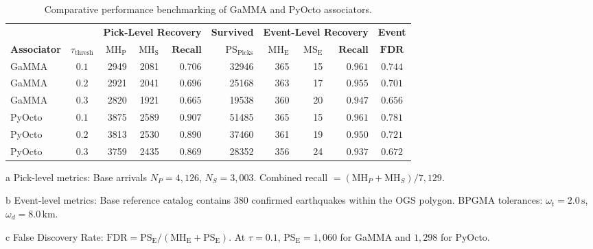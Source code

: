 \begin{table}[htbp]
  \centering
  \small
  \caption{Comparative performance benchmarking of GaMMA and PyOcto associators.}
  \label{tab:associator_benchmark}
  \begin{threeparttable}
    \begin{tabularx}{\linewidth}{l c r r r r r r r c}
      \toprule
      & & \multicolumn{3}{c}{\textbf{Pick-Level Recovery}\tnote{a}} & \textbf{Survived} & \multicolumn{3}{c}{\textbf{Event-Level Recovery}\tnote{b}} & \textbf{Event} \\
      \cmidrule(lr){3-5} \cmidrule(lr){7-9}
      \textbf{Associator} & $\tau_{\mathrm{thresh}}$ & $\mathrm{MH}_{\mathrm{P}}$ & $\mathrm{MH}_{\mathrm{S}}$ & $\mathbf{Recall}$ & $\mathrm{PS}_{\mathrm{Picks}}$ & $\mathrm{MH}_{\mathrm{E}}$ & $\mathrm{MS}_{\mathrm{E}}$ & $\mathbf{Recall}$ & $\mathbf{FDR}$\tnote{c} \\
      \midrule
      GaMMA & $0.1$ & \num{2949} & \num{2081} & $0.706$ & \num{32946} & \num{365} & \num{15} & $\mathbf{0.961}$ & $0.744$ \\
      GaMMA & $0.2$ & \num{2921} & \num{2041} & $0.696$ & \num{25168} & \num{363} & \num{17} & $0.955$ & $0.701$ \\
      GaMMA & $0.3$ & \num{2820} & \num{1921} & $0.665$ & \num{19538} & \num{360} & \num{20} & $0.947$ & $0.656$ \\
      \midrule
      PyOcto & $0.1$ & \num{3875} & \num{2589} & $\mathbf{0.907}$ & \num{51485} & \num{365} & \num{15} & $\mathbf{0.961}$ & $0.781$ \\
      PyOcto & $0.2$ & \num{3813} & \num{2530} & $0.890$ & \num{37460} & \num{361} & \num{19} & $0.950$ & $0.721$ \\
      PyOcto & $0.3$ & \num{3759} & \num{2435} & $0.869$ & \num{28352} & \num{356} & \num{24} & $0.937$ & $0.672$ \\
      \bottomrule
    \end{tabularx}
    \begin{tablenotes}[flushleft]
      \footnotesize
      \item[a] Pick-level metrics: Base arrivals $N_P = 4{,}126$, $N_S = 3{,}003$. Combined recall $= (\mathrm{MH}_P + \mathrm{MH}_S) / 7{,}129$.
      \item[b] Event-level metrics: Base reference catalog contains 380 confirmed earthquakes within the OGS polygon. BPGMA tolerances: $\omega_t = 2.0\,\unit{\second}$, $\omega_d = 8.0\,\unit{\kilo\meter}$.
      \item[c] False Discovery Rate: $\mathrm{FDR} = \mathrm{PS}_{\mathrm{E}} / (\mathrm{MH}_{\mathrm{E}} + \mathrm{PS}_{\mathrm{E}})$. At $\tau=0.1$, $\mathrm{PS}_{\mathrm{E}} = 1{,}060$ for GaMMA and $1{,}298$ for PyOcto.

\end{tablenotes}
\end{threeparttable}
\end{table}
